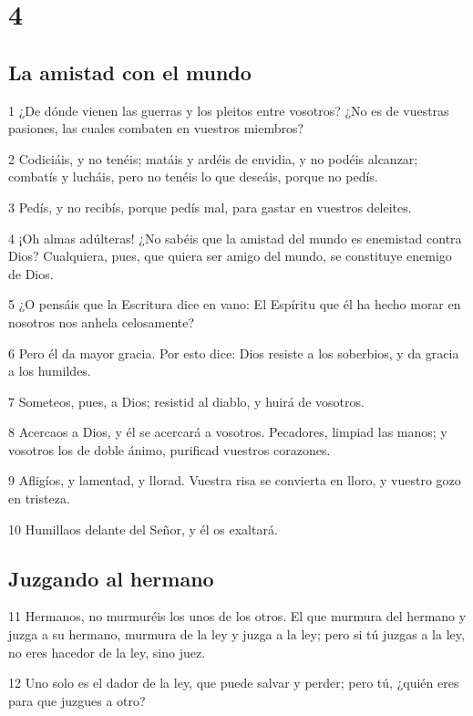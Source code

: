 \chapter{4}

\section*{La amistad con el mundo}

\par 1 ¿De dónde vienen las guerras y los pleitos entre vosotros? ¿No es de vuestras pasiones, las cuales combaten en vuestros miembros?
\par 2 Codiciáis, y no tenéis; matáis y ardéis de envidia, y no podéis alcanzar; combatís y lucháis, pero no tenéis lo que deseáis, porque no pedís.
\par 3 Pedís, y no recibís, porque pedís mal, para gastar en vuestros deleites.
\par 4 ¡Oh almas adúlteras! ¿No sabéis que la amistad del mundo es enemistad contra Dios? Cualquiera, pues, que quiera ser amigo del mundo, se constituye enemigo de Dios.
\par 5 ¿O pensáis que la Escritura dice en vano: El Espíritu que él ha hecho morar en nosotros nos anhela celosamente?
\par 6 Pero él da mayor gracia. Por esto dice: Dios resiste a los soberbios, y da gracia a los humildes.
\par 7 Someteos, pues, a Dios; resistid al diablo, y huirá de vosotros.
\par 8 Acercaos a Dios, y él se acercará a vosotros. Pecadores, limpiad las manos; y vosotros los de doble ánimo, purificad vuestros corazones.
\par 9 Afligíos, y lamentad, y llorad. Vuestra risa se convierta en lloro, y vuestro gozo en tristeza.
\par 10 Humillaos delante del Señor, y él os exaltará.

\section*{Juzgando al hermano}

\par 11 Hermanos, no murmuréis los unos de los otros. El que murmura del hermano y juzga a su hermano, murmura de la ley y juzga a la ley; pero si tú juzgas a la ley, no eres hacedor de la ley, sino juez.
\par 12 Uno solo es el dador de la ley, que puede salvar y perder; pero tú, ¿quién eres para que juzgues a otro?


